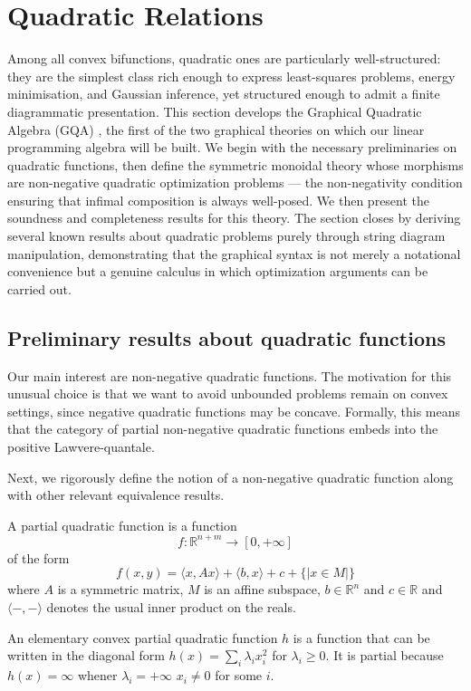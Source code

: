 \section{Quadratic Relations}

Among all convex bifunctions, quadratic ones are particularly well-structured:
they are the simplest class rich enough to express least-squares problems, energy minimisation, and Gaussian inference, yet structured enough to admit a finite diagrammatic presentation. This section develops the Graphical Quadratic Algebra (GQA) \cite{stein2024gqa}, the first of the two graphical theories on which our linear programming algebra will be built.
We begin with the necessary preliminaries on quadratic functions, then define the symmetric monoidal theory whose morphisms are non-negative quadratic optimization problems — the non-negativity condition ensuring that infimal composition is always well-posed. We then present the soundness and completeness results for this theory. The section closes by deriving several known results about quadratic problems purely through string diagram manipulation, demonstrating that the graphical syntax is not merely a notational convenience but a genuine calculus in which optimization arguments can be carried out.
\subsection{Preliminary results about quadratic functions}

Our main interest are non-negative quadratic functions. The motivation for this
unusual choice is that we want to avoid unbounded problems remain on convex settings, since negative quadratic functions
may be concave. Formally,
this means that the category of partial non-negative quadratic functions embeds into the positive
Lawvere-quantale.

Next, we rigorously define the notion of a non-negative quadratic function
along with other relevant equivalence results.

\begin{definition}
    A partial quadratic function is a function
\[
f : \mathbb{R}^{n+m} \to [0,+\infty]
\]
of the form
\[
f(x,y) = \langle x, Ax\rangle + \langle b, x\rangle + c +\{| x \in M|\}
\]
where $A$ is a symmetric matrix, $M$ is an affine subspace, $b \in \mathbb{R}^n$ and $c \in \mathbb{R}$ and $\langle-,-\rangle$ denotes the usual inner product on the reals.
\end{definition}

\begin{definition}
    An elementary convex partial quadratic function $h$ is a function that can be written in the diagonal form $h(x) = \sum_i \lambda_i x_i^2$ for $\lambda_i \ge 0$. It is partial because $h(x) = \infty$ whener $\lambda_i = +\infty$ $x_i \neq 0$ for some $i$.
\end{definition}


